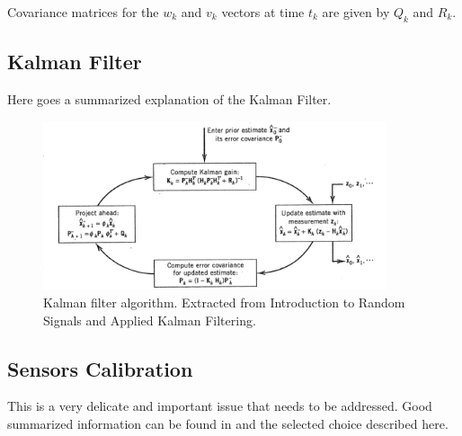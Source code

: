 \documentclass[a4paper,10pt]{article}
\begin{document}
Covariance matrices for the $w_k$ and $v_k$ vectors at time $t_k$ are given by $Q_k$ and $R_k$.

\subsection{Kalman Filter}
\label{sec:KalmanFilter}
Here goes a summarized explanation of the Kalman Filter.
\begin{figure}[!ht]
 \centering
 \includegraphics[width=0.9\textwidth]{./fig/kalman_loop.png}
 \caption{Kalman filter algorithm. Extracted from Introduction to Random Signals and Applied Kalman Filtering.}
 \label{fig:kalmanLoop}
\end{figure}

\subsection{Sensors Calibration}
This is a very delicate and important issue that needs to be addressed. Good summarized information can be found in \cite{Cucu2012} and the selected choice described here.

\newpage
\end{document}
